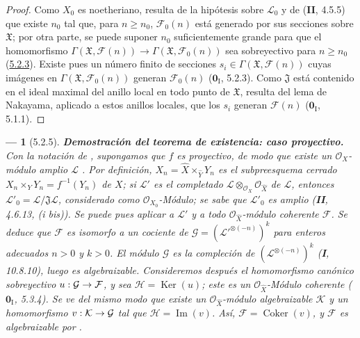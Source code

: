 \documentclass[10pt,oneside,openany]{book}
\theoremstyle{egaenv}\newtheorem*{env}{---}
\theoremstyle{egastatement}
\theoremstyle{egadescription}
\renewcommand{\geq}{\geqslant}
\renewcommand{\to}{\mathchoice{\longrightarrow}{\rightarrow}{\rightarrow}{\rightarrow}}
\begin{document}
\begin{proof}
Como $X_0$ es noetheriano, resulta de la hipótesis sobre $\mathcal L_0$ y de
(\textbf{II}, 4.5.5) que existe $n_0$ tal que, para $n\geq n_0$, $\mathcal F_0(n)$ está
generado por sus secciones sobre $\mathfrak X$; por otra parte, se puede suponer
$n_0$ suficientemente grande para que el homomorfismo
$\Gamma(\mathfrak X,\mathcal F(n))\longrightarrow
\Gamma(\mathfrak X,\mathcal F_0(n))$
sea sobreyectivo para $n\geq n_0$ (\hyperref[III.5.2.3-fr]{5.2.3}). Existe pues
un número finito de secciones $s_i\in\Gamma(\mathfrak X,\mathcal F(n))$ cuyas
imágenes en $\Gamma(\mathfrak X,\mathcal F_0(n))$ generan $\mathcal F_0(n)$
($\mathbf{0}_{\mathrm I}$, 5.2.3). Como $\mathfrak J$ está contenido en el ideal maximal del
anillo local en todo punto de $\mathfrak X$, resulta del lema de Nakayama,
aplicado a estos anillos locales, que los $s_i$ generan $\mathcal F(n)$
($\mathbf{0}_{\mathrm I}$, 5.1.1).
\end{proof}

\begin{env}[5.2.5]
\label{III.5.2.5}
\label{III.5.2.5-fr}
\textbf{Demostración del teorema de existencia: caso proyectivo.}
Con la notación de , supongamos que $f$ es
\emph{proyectivo}, de modo que existe un $\mathcal O_X$-módulo amplio $\mathcal L$
. Por definición,
$X_n=\widehat X\times_{\widehat Y}Y_n$
es el subpreesquema cerrado
$X_n\times_Y Y_n=f^{-1}(Y_n)$ de $X$; si
$\mathcal L'$ es el
completado $\mathcal L\otimes_{\mathcal O_X}\mathcal O_{\widehat X}$ de $\mathcal L$, entonces
$\mathcal L'_0=\mathcal L/\mathfrak J\mathcal L$, considerado como
$\mathcal O_{X_0}$-Módulo; se sabe que $\mathcal L'_0$ es \emph{amplio}
(\textbf{II}, 4.6.13, (i \emph{bis})). Se puede pues aplicar a $\mathcal L'$ y a todo
$\mathcal O_{\widehat X}$-módulo coherente $\mathcal F$. Se deduce que
$\mathcal F$ es isomorfo a un cociente de
$\mathcal G=(\mathcal L'^{\otimes(-n)})^k$
para enteros adecuados $n>0$ y $k>0$. El módulo $\mathcal G$ es la
compleción de $(\mathcal L^{\otimes(-n)})^k$ (\textbf{I}, 10.8.10), luego es algebraizable. Consideremos después el homomorfismo canónico sobreyectivo $u:\mathcal G\to\mathcal F$, y sea $\mathcal H=\operatorname{Ker}(u)$; este es un
$\mathcal O_{\widehat X}$-Módulo coherente ($\mathbf{0}_{\mathrm I}$, 5.3.4). Se ve del
mismo modo que existe un $\mathcal O_{\widehat X}$-módulo algebraizable $\mathcal K$ y un homomorfismo
$v:\mathcal K\to\mathcal G$ tal que $\mathcal H=\operatorname{Im}(v)$. Así,
$\mathcal F=\operatorname{Coker}(v)$, y $\mathcal F$ es algebraizable por
.
\end{env}
\end{document}
